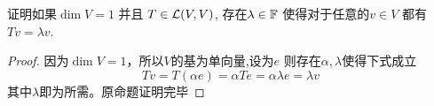 \begin{problem}{7}
  证明如果$\dim V = 1$ 并且 $T\in \mathcal{L}(V,V)$,
  存在$\lambda\in \mathbb{F}$ 使得对于任意的$v\in V$
  都有$Tv=\lambda v$.
\end{problem}

\begin{proof}
  因为$\dim V = 1$，所以$V$的基为单向量,设为$e$
  则存在$\alpha,\lambda$使得下式成立
  \begin{displaymath}
    Tv=T(\alpha e)=\alpha Te =\alpha \lambda e = \lambda v
  \end{displaymath}
  其中$\lambda$即为所需。原命题证明完毕
  
\end{proof}

